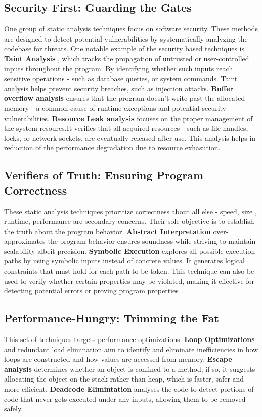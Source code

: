 \subsection{Security First: Guarding the Gates}
One group of static analysis techniques focus on software security. These methods are designed to detect potential vulnerabilities by systematically analyzing the codebase for threats.
One notable example of the security based techniques is \textbf{Taint Analysis} \cite{arzt2014flowdroid,huang2015scalable,lerch2014flowtwist,tripp2009taj}, which tracks the propagation of untrusted or user-controlled inputs throughout the program. By identifying whether such inputs reach sensitive operations - such as database queries, or system commands.
Taint analysis helps prevent security breaches, such as injection attacks. 
\textbf{Buffer overflow analysis} \cite{bufferoverflow,le2008marple,xie2003archer} ensures that the program doesn't write past the allocated memory - a common cause of runtime exceptions and potential security vulnerabilities.
\textbf{Resource Leak analysis} \cite{weimer2004finding} focuses on the proper management of the system resoures.It verifies that all acquired resources - such as file handles, locks, or network sockets, are eventually released after use. This analysis helps in reduction of the performance degradation due to resource exhasution.

\subsection{Verifiers of Truth: Ensuring Program Correctness}
These static analysis techniques prioritize correctness about all else - speed, size , runtime, performance are secondary concerns. 
Their sole objective is to establish the truth about the program behavior.
\textbf{Abstract Interpretation} \cite{cousot1996abstract} over-approximates the program behavior ensures soundness while striving to maintain scalability albeit precision.
\textbf{Symbolic Execution} \cite{king1975new} explores all possible execution paths by using symbolic inputs instead of concrete values. 
It generates logical constraints that must hold for each path to be taken.
This technique can also be used to verify whether certain properties may be violated, making it effective for detecting potential errors or proving program properties \cite{baldoni2018survey}.

\subsection{Performance-Hungry: Trimming the Fat}
This set of techniques targets performance optimizations. \textbf{Loop Optimizations} \cite{muchnick1997advanced} and redundant load elimination aim to identify and eliminate inefficiencies in how loops are constructed and how values are accessed from memory.
\textbf{Escape analysis} \cite{choi1999escape} determines whether an object is confined to a method; if so, it suggests allocating the object on the stack rather than heap, which is faster, safer and more efficient.
\textbf{Deadcode Elimintation} \cite{bodik1997partial,knoop1994partial} analyses the code to detect portions of code that never gets executed under any inputs, allowing them to be removed safely.


